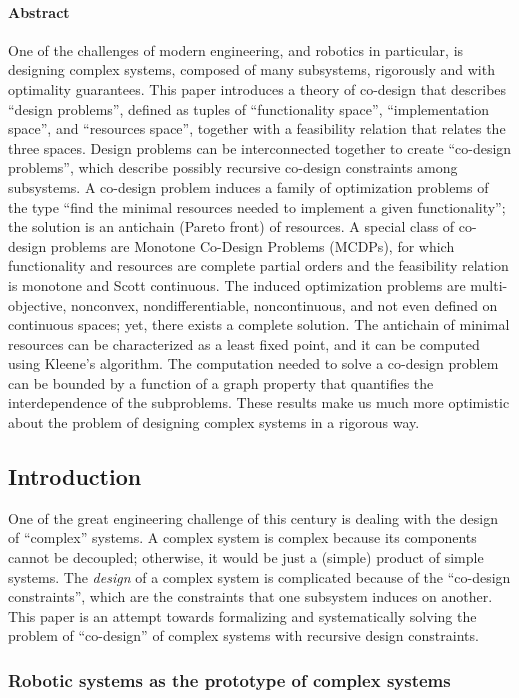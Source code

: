 \paragraph{Abstract}
One of the challenges of modern engineering, and robotics in particular,
is designing complex systems, composed of many subsystems, rigorously
and with optimality guarantees. This paper introduces a theory of
co-design that describes ``design problems'', defined as tuples
of ``functionality space'', ``implementation space'', and ``resources
space'', together with a feasibility relation that relates the three
spaces. Design problems can be interconnected together to create ``co-design
problems'', which describe possibly recursive co-design constraints
among subsystems. A co-design problem induces a family of optimization
problems of the type ``find the minimal resources needed to implement
a given functionality''; the solution is an antichain (Pareto front)
of resources. A special class of co-design problems are Monotone Co-Design
Problems (MCDPs), for which functionality and resources are complete
partial orders and the feasibility relation is monotone and Scott
continuous. The induced optimization problems are multi-objective,
nonconvex, nondifferentiable, noncontinuous, and not even defined
on continuous spaces; yet, there exists a complete solution. The antichain
of minimal resources can be characterized as a least fixed point,
and it can be computed using Kleene's algorithm. The computation needed
to solve a co-design problem can be bounded by a function of a graph
property that quantifies the interdependence of the subproblems. These
results make us much more optimistic about the problem of designing
complex systems in a rigorous way.  


\subsection{Introduction}
One of the great engineering challenge of this
century is dealing with the design of ``complex'' systems. A complex
system is complex because its components cannot be decoupled; otherwise,
it would be just a (simple) product of simple systems. The \emph{design}
of a complex system is complicated because of the ``co-design constraints'',
which are the constraints that one subsystem induces on another. This
paper is an attempt towards formalizing and systematically solving
the problem of ``co-design'' of complex systems with recursive design
constraints.

\subsubsection{Robotic systems as the prototype of complex systems}

